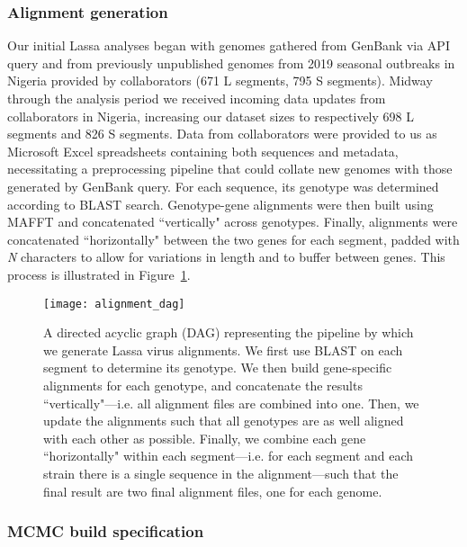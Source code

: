\subsubsection{Alignment generation}

Our initial Lassa analyses began with genomes gathered from GenBank via API query and from previously unpublished genomes from 2019 seasonal outbreaks in Nigeria provided by collaborators (671 L segments, 795 S segments)\cite{liana2019}. %
Midway through the analysis period we received incoming data updates from collaborators in Nigeria, increasing our dataset sizes to respectively 698 L segments and 826 S segments.
Data from collaborators were provided to us as Microsoft Excel spreadsheets containing both sequences and metadata, necessitating a preprocessing pipeline that could collate new genomes with those generated by GenBank query.
For each sequence, its genotype was determined according to BLAST search.
Genotype-gene alignments were then built using MAFFT and concatenated ``vertically" across genotypes\cite{mafft}. %
Finally, alignments were concatenated ``horizontally" between the two genes for each segment, padded with \textit{N} characters to allow for variations in length and to buffer between genes.
This process is illustrated in Figure~\ref{fig:alignment_dag}.

\begin{figure}[ht]
  \centering
  \medskip
  \texttt{[image: alignment\_dag]}
  \caption[Lassa alignment pipeline]{A directed acyclic graph (DAG) representing the pipeline by which we generate Lassa virus alignments. We first use BLAST on each segment to determine its genotype. We then build gene-specific alignments for each genotype, and concatenate the results ``vertically"---i.e. all alignment files are combined into one. Then, we update the alignments such that all genotypes are as well aligned with each other as possible. Finally, we combine each gene ``horizontally" within each segment---i.e. for each segment and each strain there is a single sequence in the alignment---such that the final result are two final alignment files, one for each genome.}
  \label{fig:alignment_dag}
\end{figure}

\subsubsection{MCMC build specification}

